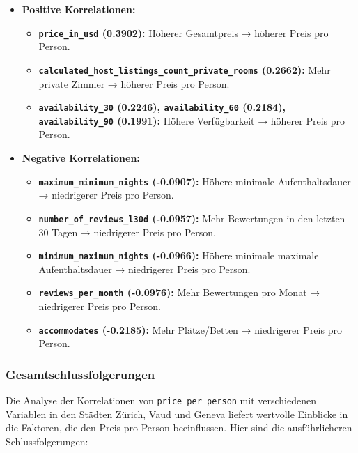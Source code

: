 \documentclass[
  journal,
]{IEEEtran}%
\providecommand{\tightlist}{%
  \setlength{\itemsep}{0pt}\setlength{\parskip}{0pt}}\usepackage{longtable,booktabs,array}
\begin{document}
\begin{itemize}
\item
  \textbf{Positive Korrelationen:}

  \begin{itemize}
  \tightlist
  \item
    \textbf{\texttt{price\_in\_usd} (0.3902):} Höherer Gesamtpreis →
    höherer Preis pro Person.
  \item
    \textbf{\texttt{calculated\_host\_listings\_count\_private\_rooms}
    (0.2662):} Mehr private Zimmer → höherer Preis pro Person.
  \item
    \textbf{\texttt{availability\_30} (0.2246),
    \texttt{availability\_60} (0.2184), \texttt{availability\_90}
    (0.1991):} Höhere Verfügbarkeit → höherer Preis pro Person.
  \end{itemize}
\item
  \textbf{Negative Korrelationen:}

  \begin{itemize}
  \tightlist
  \item
    \textbf{\texttt{maximum\_minimum\_nights} (-0.0907):} Höhere
    minimale Aufenthaltsdauer → niedrigerer Preis pro Person.
  \item
    \textbf{\texttt{number\_of\_reviews\_l30d} (-0.0957):} Mehr
    Bewertungen in den letzten 30 Tagen → niedrigerer Preis pro Person.
  \item
    \textbf{\texttt{minimum\_maximum\_nights} (-0.0966):} Höhere
    minimale maximale Aufenthaltsdauer → niedrigerer Preis pro Person.
  \item
    \textbf{\texttt{reviews\_per\_month} (-0.0976):} Mehr Bewertungen
    pro Monat → niedrigerer Preis pro Person.
  \item
    \textbf{\texttt{accommodates} (-0.2185):} Mehr Plätze/Betten →
    niedrigerer Preis pro Person.
  \end{itemize}
\end{itemize}

\hypertarget{gesamtschlussfolgerungen}{%
\subsubsection{Gesamtschlussfolgerungen}\label{gesamtschlussfolgerungen}}

Die Analyse der Korrelationen von \texttt{price\_per\_person} mit
verschiedenen Variablen in den Städten Zürich, Vaud und Geneva liefert
wertvolle Einblicke in die Faktoren, die den Preis pro Person
beeinflussen. Hier sind die ausführlicheren Schlussfolgerungen:
\end{document}

